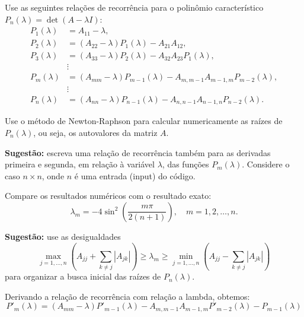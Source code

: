 \documentclass[12pt, a4paper]{article} %
\begin{document}
        Use as seguintes rela\c{c}\~oes de recorr\^encia para o polin\^omio caracter\'istico $P_n(\lambda) = \det(A - \lambda I)$:
        \begin{align*}
        P_1(\lambda) &= A_{11} - \lambda, \\
        P_2(\lambda) &= (A_{22} - \lambda) P_1(\lambda) - A_{21} A_{12}, \\
        P_3(\lambda) &= (A_{33} - \lambda) P_2(\lambda) - A_{32} A_{23} P_1(\lambda), \\
        &\vdots \\
        P_m(\lambda) &= (A_{mm} - \lambda) P_{m-1}(\lambda) - A_{m,m-1} A_{m-1,m} P_{m-2}(\lambda), \\
        &\vdots \\
        P_n(\lambda) &= (A_{nn} - \lambda) P_{n-1}(\lambda) - A_{n,n-1} A_{n-1,n} P_{n-2}(\lambda).
        \end{align*}
        
        Use o m\'etodo de Newton-Raphson para calcular numericamente as ra\'izes de $P_n(\lambda)$, ou seja, os autovalores da matriz $A$.
        
        \medskip
        
        \noindent \textbf{Sugest\~ao:} escreva uma rela\c{c}\~ao de recorr\^encia tamb\'em para as derivadas primeira e segunda, em rela\c{c}\~ao \`a vari\'avel $\lambda$, das fun\c{c}\~oes $P_m(\lambda)$. Considere o caso $n \times n$, onde $n$ \'e uma entrada (input) do c\'odigo.
        
        \medskip
        
        Compare os resultados num\'ericos com o resultado exato:
        \begin{equation*}
            \lambda_m = -4 \sin^2\left( \frac{m\pi}{2(n + 1)} \right), \quad m = 1, 2, \ldots, n.
        \end{equation*}
        
        \medskip
        
        \noindent \textbf{Sugest\~ao:} use as desigualdades
        \begin{equation*}
            \max_{j = 1, \ldots, n} \left( A_{jj} + \sum_{k \ne j} |A_{jk}| \right) \geq \lambda_m \geq \min_{j = 1, \ldots, n} \left( A_{jj} - \sum_{k \ne j} |A_{jk}| \right)
        \end{equation*}
        para organizar a busca inicial das ra\'izes de $P_n(\lambda)$.

        Derivando a rela\c{c}\~ao de recorr\^encia com rela\c{c}\~ao a lambda, obtemos:
        \begin{equation*}
            P'_m(\lambda) = (A_{mm} - \lambda) P'_{m-1}(\lambda) - A_{m,m-1} A_{m-1,m} P'_{m-2}(\lambda) - P_{m-1}(\lambda)
        \end{equation*}
\end{document}
